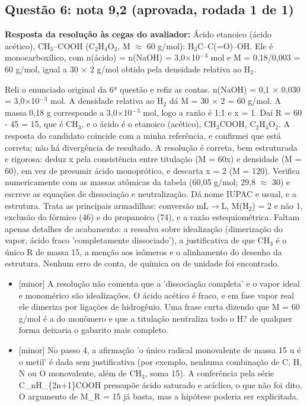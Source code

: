 \documentclass{article}%
\begin{document}
\subsection*{Questão 6: nota 9,2 (aprovada, rodada 1 de 1)}%
\textbf{Resposta da resolução às cegas do avaliador:} Ácido etanoico (ácido acético), CH$_{3}$--COOH (C$_{2}$H$_{4}$O$_{2}$, M $\approx$ 60 g/mol): H$_{3}$C--C(=O)--OH. Ele é monocarboxílico, com n(ácido) = n(NaOH) = 3,0$\times$10$^{-}$$^3$ mol e M = 0,18/0,003 = 60 g/mol, igual a 30 $\times$ 2 g/mol obtido pela densidade relativa ao H$_{2}$.\par %
Reli o enunciado original da 6ª questão e refiz as contas. n(NaOH) = 0,1 $\times$ 0,030 = 3,0$\times$10$^{-}$$^3$ mol. A densidade relativa ao H$_{2}$ dá M = 30 $\times$ 2 = 60 g/mol. A massa 0,18 g corresponde a 3,0$\times$10$^{-}$$^3$ mol, logo a razão é 1:1 e x = 1. Daí R = 60 - 45 = 15, que é CH$_{3}$, e o ácido é o etanoico (acético), CH$_{3}$COOH, C$_{2}$H$_{4}$O$_{2}$. A resposta do candidato coincide com a minha referência, e confirmei que está correta; não há divergência de resultado. A resolução é correta, bem estruturada e rigorosa: deduz x pela consistência entre titulação (M = 60x) e densidade (M = 60), em vez de presumir ácido monoprótico, e descarta x = 2 (M = 120). Verifica numericamente com as massas atômicas da tabela (60,05 g/mol; 29,8 $\approx$ 30) e escreve as equações de dissociação e neutralização. Dá nome IUPAC e usual, e a estrutura. Trata as principais armadilhas: conversão mL$\to$L, M(H$_{2}$) = 2 e não 1, exclusão do fórmico (46) e do propanoico (74), e a razão estequiométrica. Faltam apenas detalhes de acabamento: a ressalva sobre idealização (dimerização do vapor, ácido fraco 'completamente dissociado'), a justificativa de que CH$_{3}$ é o único R de massa 15, a menção aos isômeros e o alinhamento do desenho da estrutura. Nenhum erro de conta, de química ou de unidade foi encontrado.%
\begin{itemize}%
\item%
{[}minor{]} A resolução não comenta que a 'dissociação completa' e o vapor ideal e monomérico são idealizações. O ácido acético é fraco, e em fase vapor real ele dimeriza por ligações de hidrogênio. Uma frase curta dizendo que M = 60 g/mol é a do monômero e que a titulação neutraliza todo o H? de qualquer forma deixaria o gabarito mais completo.%
\item%
{[}minor{]} No passo 4, a afirmação 'o único radical monovalente de massa 15 u é o metil' é dada sem justificativa (por exemplo, nenhuma combinação de C, H, N ou O monovalente, além de CH$_{3}$, soma 15). A conferência pela série C\_nH\_\{2n+1\}COOH pressupõe ácido saturado e acíclico, o que não foi dito. O argumento de M\_R = 15 já basta, mas a hipótese poderia ser explicitada.%

\end{itemize}$$
\end{document}
